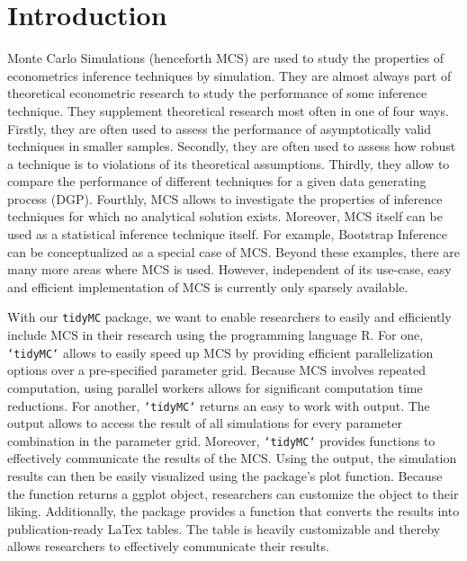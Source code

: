 \documentclass[10pt,a4paper]{article}
\begin{document}
	\restoregeometry
	
		
		
				\newpage
	\hypertarget{introduction}{%
 \section{Introduction}\label{introduction}}

 Monte Carlo Simulations (henceforth MCS) are used to study the
 properties of econometrics inference techniques by simulation. They are
 almost always part of theoretical econometric research to study the
 performance of some inference technique. They supplement theoretical
 research most often in one of four ways. Firstly, they are often used
 to assess the performance of asymptotically valid techniques in smaller
 samples. Secondly, they are often used to assess how robust a technique
 is to violations of its theoretical assumptions. Thirdly, they allow to
 compare the performance of different techniques for a given data
 generating process (DGP). Fourthly, MCS allows to investigate the
 properties of inference techniques for which no analytical solution
 exists. Moreover, MCS itself can be used as a statistical inference
 technique itself. For example, Bootstrap Inference can be
 conceptualized as a special case of MCS. Beyond these examples, there
 are many more areas where MCS is used. However, independent of its
 use-case, easy and efficient implementation of MCS is currently only
 sparsely available.

 With our \texttt{tidyMC} package, we want to enable researchers to
 easily and efficiently include MCS in their research using the
 programming language R. For one, \texttt{`tidyMC`} allows to easily
 speed up MCS by providing efficient parallelization options over a
 pre-specified parameter grid. Because MCS involves repeated
 computation, using parallel workers allows for significant computation
 time reductions. For another, \texttt{`tidyMC`} returns an easy to work
 with output. The output allows to access the result of all simulations
 for every parameter combination in the parameter grid. Moreover,
 \texttt{`tidyMC`} provides functions to effectively communicate the
 results of the MCS. Using the output, the simulation results can then
 be easily visualized using the package's plot function. Because the
 function returns a ggplot object, researchers can customize the object
 to their liking. Additionally, the package provides a function that
 converts the results into publication-ready LaTex tables. The table is
 heavily customizable and thereby allows researchers to effectively
 communicate their results.
\end{document}
